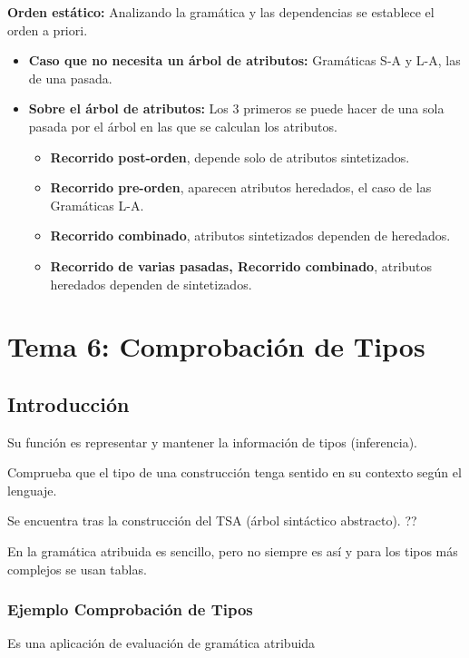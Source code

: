 \documentclass[12pt, twoside, openright]{report} %
\begin{document}
\textbf{Orden estático:} Analizando la gramática y las dependencias se establece el orden a priori.
\begin{itemize}
	\item \textbf{Caso que no necesita un árbol de atributos:} Gramáticas S-A y L-A, las de una pasada.
	\item \textbf{Sobre el árbol de atributos:} Los 3 primeros se puede hacer de una sola pasada por el árbol en las que se calculan los atributos.
	      \begin{itemize}
		      \item \textbf{Recorrido post-orden}, depende solo de atributos sintetizados.
		      \item \textbf{Recorrido pre-orden}, aparecen atributos heredados, el caso de las Gramáticas L-A.
		      \item \textbf{Recorrido combinado}, atributos sintetizados dependen de heredados.
		      \item \textbf{Recorrido de varias pasadas, Recorrido combinado}, atributos heredados dependen de sintetizados.
	      \end{itemize}
\end{itemize}

\begin{figure}[H]
	{\centering
		\def\svgwidth{1.1\textwidth}
		}
\end{figure}

\chapter{Tema 6: Comprobación de Tipos}
\section{Introducción}
Su función es representar y mantener la información de tipos (inferencia).

Comprueba que el tipo de una construcción tenga sentido en su contexto según el lenguaje.

Se encuentra tras la construcción del TSA (árbol sintáctico abstracto). ??

En la gramática atribuida es sencillo, pero no siempre es así y para los tipos más complejos se usan tablas.

\subsection{Ejemplo Comprobación de Tipos}
Es una aplicación de evaluación de gramática atribuida
\end{document}
